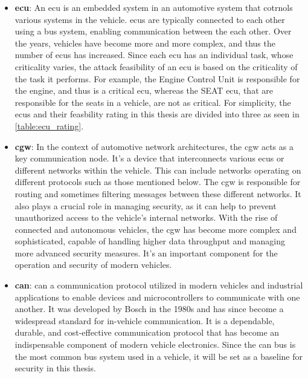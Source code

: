 \begin{itemize}
    \item \textbf{\gls{ecu}}: An \gls{ecu} is an embedded system in an automotive system that cotrnols various systems in the vehicle.
    \gls{ecu}s are typically connected to each other using a bus system, enabling communication between the each other.
    Over the years, vehicles have become more and more complex, and thus the number of \gls{ecu}s has increased.
    Since each \gls{ecu} has an individual task, whose criticality varies, the attack feasibility of an \gls{ecu} is based on the criticality of the task it performs.
    For example, the Engine Control Unit is responsible for the engine, and thus is a critical \gls{ecu}, 
    whereas the SEAT \gls{ecu}, that are responsible for the seats in a vehicle, are not as critical.
    For simplicity, the \gls{ecu}s and their feasbility rating in this thesis are divided into three as seen in \ref{table:ecu_rating}.

    \item \textbf{\gls{cgw}}: In the context of automotive network architectures, the \gls{cgw} acts as a key communication node. 
    It's a device that interconnects various \gls{ecu}s or different networks within the vehicle. 
    This can include networks operating on different protocols such as those mentioned below.
    The \gls{cgw} is responsible for routing and sometimes filtering messages between these different networks. 
    It also plays a crucial role in managing security, as it can help to prevent unauthorized access to the vehicle's internal networks.
    With the rise of connected and autonomous vehicles, the \gls{cgw} has become more complex and sophisticated, 
    capable of handling higher data throughput and managing more advanced security measures. 
    It's an important component for the operation and security of modern vehicles.
    
    \item \textbf{\gls{can}}: \gls{can} a communication protocol utilized in modern vehicles and industrial applications 
    to enable devices and microcontrollers to communicate with one another. 
    It was developed by Bosch in the 1980s and has since become a widespread standard for in-vehicle communication.
    It is a dependable, durable, and cost-effective communication protocol that has become an indispensable component of modern vehicle electronics.
    Since the \gls{can} bus is the most common bus system used in a vehicle, it will be set as a baseline for security in this thesis.


\end{itemize}
